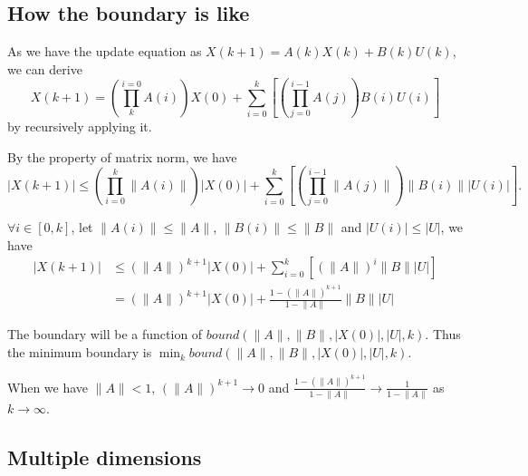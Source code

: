 
\subsection{How the boundary is like}

As we have the update equation as
$ X(k+1) = A(k) X(k) + B(k) U(k) $, we can derive 
\begin{equation}
X(k+1) = ( \prod_{k}^{i=0} A(i) ) X(0) + \sum_{i=0}^{k} [ ( \prod_{j=0}^{i-1} A(j) ) B(i) U(i)  ] 
\end{equation}
by recursively applying it.

By the property of matrix norm, we have
\begin{equation}
| X(k+1) | \leq ( \prod_{i=0}^{k} \lVert A(i) \rVert ) | X(0) | + \sum_{i=0}^{k} [ ( \prod_{j=0}^{i-1} \lVert A(j) \rVert ) \lVert B(i) \rVert | U(i) |  ].
\end{equation}

$ \forall i \in [0, k] $, let $ \lVert A(i) \rVert \leq \lVert A \rVert $, $  \lVert B(i) \rVert \leq \lVert B \rVert $ and $ | U(i) | \leq | U | $, we have
\begin{equation}
\begin{aligned}
| X(k+1) | & \leq ( \lVert A \rVert )^{k+1} | X(0) | + \sum_{i=0}^{k} [ ( \lVert A \rVert )^{i} \lVert B \rVert | U |  ] \\
& = ( \lVert A \rVert )^{k+1} | X(0) | + \frac{1 - ( \lVert A \rVert )^{k+1} }{1 - \lVert A \rVert }  \lVert B \rVert | U |
\end{aligned}
\end{equation}

The boundary will be a function of $ bound ( \lVert A \rVert, \lVert B \rVert, | X(0) |, | U |, k ) $.
Thus the minimum boundary is $ \min_{k} bound ( \lVert A \rVert, \lVert B \rVert, | X(0) |, | U |, k ) $.

When we have $ \lVert A \rVert < 1 $, 
$ ( \lVert A \rVert )^{k+1} \rightarrow 0 $ and
$ \frac{1 - (\lVert A \rVert )^{k+1} }{1 - \lVert A \rVert} \rightarrow \frac{1}{1 - \lVert A \rVert } $
as $ k \rightarrow \infty $.

\subsection{Multiple dimensions}

